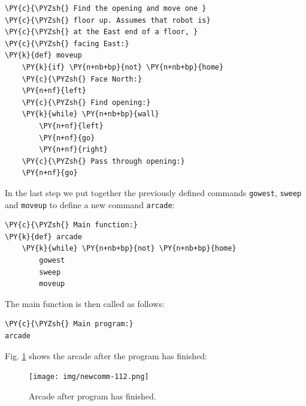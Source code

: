 \begin{bbox}
\begin{Verbatim}[commandchars=\\\{\}]
\PY{c}{\PYZsh{} Find the opening and move one }
\PY{c}{\PYZsh{} floor up. Assumes that robot is}
\PY{c}{\PYZsh{} at the East end of a floor, }
\PY{c}{\PYZsh{} facing East:}
\PY{k}{def} moveup
    \PY{k}{if} \PY{n+nb+bp}{not} \PY{n+nb+bp}{home}
    \PY{c}{\PYZsh{} Face North:}
    \PY{n+nf}{left}
    \PY{c}{\PYZsh{} Find opening:}
    \PY{k}{while} \PY{n+nb+bp}{wall}
        \PY{n+nf}{left}
        \PY{n+nf}{go}
        \PY{n+nf}{right}
    \PY{c}{\PYZsh{} Pass through opening:}
    \PY{n+nf}{go}
\end{Verbatim}
\end{bbox}
\vspace{6mm}

\noindent
In the last step we put together the previously defined 
commands {\tt gowest}, {\tt sweep} and {\tt moveup} to
define a new command {\tt arcade}:\\

\begin{bbox}
\begin{Verbatim}[commandchars=\\\{\}]
\PY{c}{\PYZsh{} Main function:}
\PY{k}{def} arcade
    \PY{k}{while} \PY{n+nb+bp}{not} \PY{n+nb+bp}{home}
        gowest
        sweep
        moveup
\end{Verbatim}
\end{bbox}
\vspace{6mm}

\noindent
The main function is then called as follows:\\

\begin{bbox}
\begin{Verbatim}[commandchars=\\\{\}]
\PY{c}{\PYZsh{} Main program:}
arcade
\end{Verbatim}
\end{bbox}
\vspace{6mm}

\noindent
Fig. \ref{fig:newcomm-112} shows the arcade after the program
has finished:

\begin{figure}[!ht]
\begin{center}
\texttt{[image: img/newcomm-112.png]}
\vspace{-0mm}
\caption{Arcade after program has finished.}
\label{fig:newcomm-112}
\vspace{-6mm}
\end{center}
\end{figure}
\noindent

